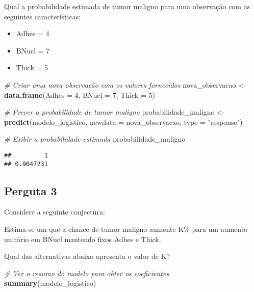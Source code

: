 \documentclass[
]{article}
\newenvironment{Shaded}{\begin{snugshade}}{\end{snugshade}}
\newcommand{\AttributeTok}[1]{\textcolor[rgb]{0.13,0.29,0.53}{#1}}
\newcommand{\CommentTok}[1]{\textcolor[rgb]{0.56,0.35,0.01}{\textit{#1}}}
\newcommand{\DecValTok}[1]{\textcolor[rgb]{0.00,0.00,0.81}{#1}}
\newcommand{\FunctionTok}[1]{\textcolor[rgb]{0.13,0.29,0.53}{\textbf{#1}}}
\newcommand{\NormalTok}[1]{#1}
\newcommand{\OtherTok}[1]{\textcolor[rgb]{0.56,0.35,0.01}{#1}}
\newcommand{\StringTok}[1]{\textcolor[rgb]{0.31,0.60,0.02}{#1}}
\providecommand{\tightlist}{%
  \setlength{\itemsep}{0pt}\setlength{\parskip}{0pt}}
\begin{document}
Qual a probabilidade estimada de tumor maligno para uma observação com
as seguintes características:

\begin{itemize}
\tightlist
\item
  Adhes = 4
\item
  BNucl = 7
\item
  Thick = 5
\end{itemize}

\begin{Shaded}
\begin{Highlighting}[]
\CommentTok{\# Criar uma nova observação com os valores fornecidos}
\NormalTok{nova\_observacao }\OtherTok{\textless{}{-}} \FunctionTok{data.frame}\NormalTok{(}\AttributeTok{Adhes =} \DecValTok{4}\NormalTok{, }\AttributeTok{BNucl =} \DecValTok{7}\NormalTok{, }\AttributeTok{Thick =} \DecValTok{5}\NormalTok{)}

\CommentTok{\# Prever a probabilidade de tumor maligno}
\NormalTok{probabilidade\_maligno }\OtherTok{\textless{}{-}} \FunctionTok{predict}\NormalTok{(modelo\_logistico, }\AttributeTok{newdata =}\NormalTok{ nova\_observacao, }\AttributeTok{type =} \StringTok{"response"}\NormalTok{)}

\CommentTok{\# Exibir a probabilidade estimada}
\NormalTok{probabilidade\_maligno}
\end{Highlighting}
\end{Shaded}

\begin{verbatim}
##         1 
## 0.9047231
\end{verbatim}

\subsection{Perguta 3}\label{perguta-3}

Considere a seguinte conjectura:

Estima-se um que a chance de tumor maligno aumente K\% para um aumento
unitário em BNucl mantendo fixos Adhes e Thick.

Qual das alternativas abaixo apresenta o valor de K?

\begin{Shaded}
\begin{Highlighting}[]
\CommentTok{\# Ver o resumo do modelo para obter os coeficientes}
\FunctionTok{summary}\NormalTok{(modelo\_logistico)}
\end{Highlighting}
\end{Shaded}
\end{document}
